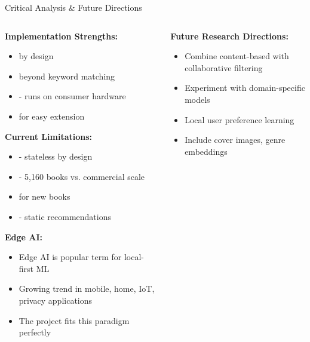 \begin{frame}{Critical Analysis \& Future Directions}

\begin{columns}[T]
  \begin{column}{0.50\textwidth}
    \textbf{Implementation Strengths:}
    \begin{itemize}
      \item {} by design
      \item {} beyond keyword matching
      \item {} - runs on consumer hardware
      \item {} for easy extension
    \end{itemize}

    \vspace{0.3cm}
    \textbf{Current Limitations:}
    \begin{itemize}
      \item {} - stateless by design
      \item {} - 5,160 books vs. commercial scale
      \item {} for new books
      \item {} - static recommendations
    \end{itemize}

    \vspace{0.3cm}
    \textbf{Edge AI:}
      \begin{itemize}
        \item Edge AI is popular term for local-first ML
        \item Growing trend in mobile, home, IoT, privacy applications
        \item The project fits this paradigm perfectly
      \end{itemize}
  \end{column}

  \begin{column}{0.45\textwidth}
    \textbf{Future Research Directions:}
    \begin{itemize}
      \item {} Combine content-based with collaborative filtering
      \item {} Experiment with domain-specific models
      \item {} Local user preference learning
      \item {} Include cover images, genre embeddings
    \end{itemize}


\end{column}
\end{columns}
\end{frame}
